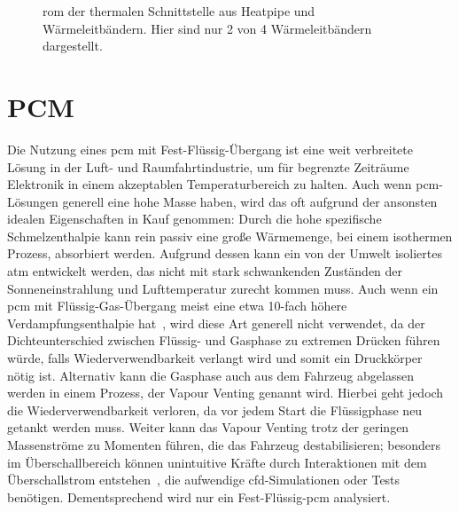 \begin{figure}
  \caption{\acs{rom} der thermalen Schnittstelle aus Heatpipe und Wärmeleitbändern. Hier sind nur 2 von 4 Wärmeleitbändern dargestellt.}\label{fig:thermale_schnittstelle}
\end{figure}

\section{PCM}\label{sec:pcm}

Die Nutzung eines \ac{pcm} mit Fest-Flüssig-Übergang ist eine weit verbreitete Lösung in der Luft- und Raumfahrtindustrie, um für begrenzte Zeiträume Elektronik in einem akzeptablen
Temperaturbereich zu halten. Auch wenn \ac{pcm}-Lösungen generell eine hohe Masse haben, wird das oft aufgrund der ansonsten idealen Eigenschaften in Kauf genommen:
Durch die hohe spezifische Schmelzenthalpie kann rein passiv eine große Wärmemenge, bei einem isothermen Prozess, absorbiert werden. Aufgrund dessen
kann ein von der Umwelt isoliertes \ac{atm} entwickelt werden, das nicht mit stark schwankenden Zuständen der Sonneneinstrahlung und Lufttemperatur
zurecht kommen muss. Auch wenn ein \ac{pcm} mit Flüssig-Gas-Übergang meist eine etwa 10-fach höhere Verdampfungsenthalpie hat~\cite{fusion-vaporization}, wird diese Art
generell nicht verwendet, da der Dichteunterschied zwischen Flüssig- und Gasphase zu extremen Drücken führen würde, falls Wiederverwendbarkeit
verlangt wird und somit ein Druckkörper nötig ist. Alternativ kann die Gasphase auch aus dem Fahrzeug abgelassen werden in einem Prozess, der
Vapour Venting genannt wird. Hierbei geht jedoch die Wiederverwendbarkeit verloren, da vor jedem Start die Flüssigphase neu getankt werden muss.
Weiter kann das Vapour Venting trotz der geringen Massenströme zu Momenten führen, die das Fahrzeug destabilisieren; besonders im Überschallbereich
können unintuitive Kräfte durch Interaktionen mit dem Überschallstrom entstehen~\cite{Deere-2011}, die aufwendige \ac{cfd}-Simulationen oder Tests benötigen.
Dementsprechend wird nur ein Fest-Flüssig-\ac{pcm} analysiert.

